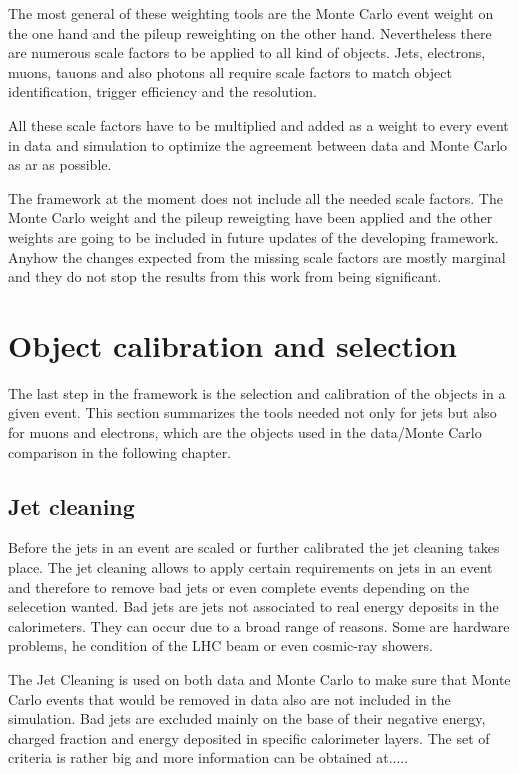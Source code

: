 The most general of these weighting tools are the Monte Carlo event weight on the one hand and the pileup reweighting on the other hand. Nevertheless there are numerous scale factors to be applied to all kind of objects. Jets, electrons, muons, tauons and also photons all require scale factors to match object identification, trigger efficiency and the resolution. 

All these scale factors have to be multiplied and added as a weight to every event in data and simulation to optimize the agreement between data and Monte Carlo as ar as possible.

The framework at the moment does not include all the needed scale factors. The Monte Carlo weight and the pileup reweigting have been applied and the other weights are going to be included in future updates of the developing framework. Anyhow the changes expected from the missing scale factors are mostly marginal and they do not stop the results from this work from being significant.

\section{Object calibration and selection}

The last step in the framework is the selection and calibration of the objects in a given event. This section summarizes the tools needed not only for jets but also for muons and electrons, which are the objects used in the data/Monte Carlo comparison in the following chapter.

\subsection{Jet cleaning}

Before the jets in an event are scaled or further calibrated the jet cleaning takes place. The jet cleaning allows to apply certain requirements on jets in an event and therefore to remove bad jets or even complete events depending on the selecetion wanted. Bad jets are jets not associated to real energy deposits in the calorimeters. They can occur due to a broad range of reasons. Some are hardware problems, he condition of the LHC beam or even cosmic-ray showers.

The Jet Cleaning is used on both data and Monte Carlo to make sure that Monte Carlo events that would be removed in data also are not included in the simulation.
Bad jets are excluded mainly on the base of their negative energy, charged fraction and energy deposited in specific calorimeter layers. The set of criteria is rather big and more information can be obtained at.....


